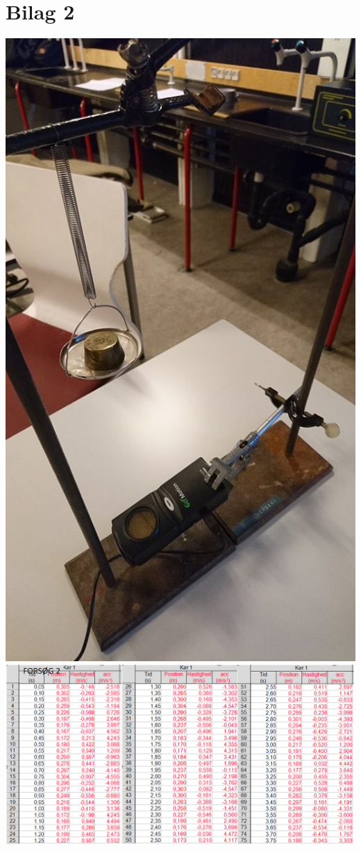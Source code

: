 \section*{Bilag 2}
\begin{center}
\includegraphics[scale=0.3]{Billeder/forsoeg2}
\includegraphics[scale=0.6]{Billeder/dataforsoeg2}
\end{center}

